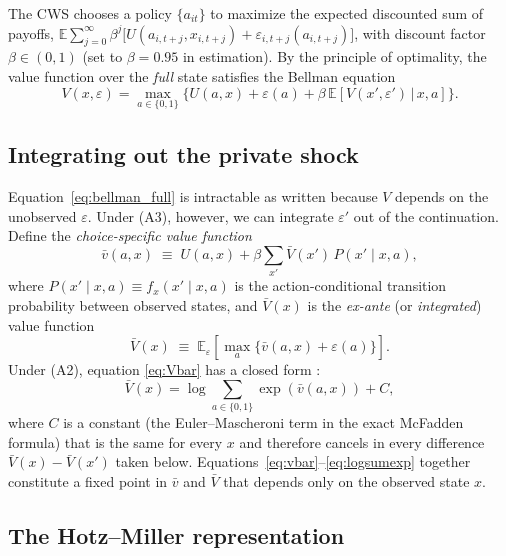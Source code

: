 The CWS chooses a policy $\{a_{it}\}$ to maximize the expected
discounted sum of payoffs, $\mathbb{E}\sum_{j=0}^{\infty} \beta^{j}
\big[ U(a_{i,t+j}, x_{i,t+j}) + \varepsilon_{i,t+j}(a_{i,t+j}) \big]$,
with discount factor $\beta \in (0, 1)$ (set to $\beta = 0.95$ in
estimation). By the principle of optimality, the value function over the
\emph{full} state satisfies the Bellman equation
\begin{equation}
V(x, \varepsilon) = \max_{a \in \{0, 1\}} \Big\{
U(a, x) + \varepsilon(a) + \beta \, \mathbb{E}\!\left[ V(x', \varepsilon')
\,\big|\, x, a \right] \Big\}.
\label{eq:bellman_full}
\end{equation}

\subsection{Integrating out the private shock}

Equation~\eqref{eq:bellman_full} is intractable as written because $V$ depends on
the unobserved $\varepsilon$. Under (A3), however, we can integrate
$\varepsilon'$ out of the continuation. Define the \emph{choice-specific value
function}
\begin{equation}
\bar v(a, x) \;\equiv\; U(a, x) + \beta \sum_{x'} \bar V(x') \, P(x' \mid x, a),
\label{eq:vbar}
\end{equation}
where $P(x' \mid x, a) \equiv f_x(x' \mid x, a)$ is the action-conditional
transition probability between observed states, and $\bar V(x)$ is the
\emph{ex-ante} (or \emph{integrated}) value function
\begin{equation}
\bar V(x) \;\equiv\; \mathbb{E}_\varepsilon \!\left[ \max_{a}
\big\{ \bar v(a, x) + \varepsilon(a) \big\} \right].
\label{eq:Vbar}
\end{equation}
Under (A2), equation \eqref{eq:Vbar} has a closed form \citep{train2009discrete}:
\begin{equation}
\bar V(x) = \log \!\sum_{a \in \{0,1\}} \exp\!\left( \bar v(a, x) \right) + C,
\label{eq:logsumexp}
\end{equation}
where $C$ is a constant (the Euler--Mascheroni term in the exact McFadden
formula) that is the same for every $x$ and therefore cancels in every
difference $\bar V(x) - \bar V(x')$ taken below.
Equations~\eqref{eq:vbar}--\eqref{eq:logsumexp} together constitute a fixed
point in $\bar v$ and $\bar V$ that depends only on the observed state $x$.

\subsection{The Hotz--Miller representation}

